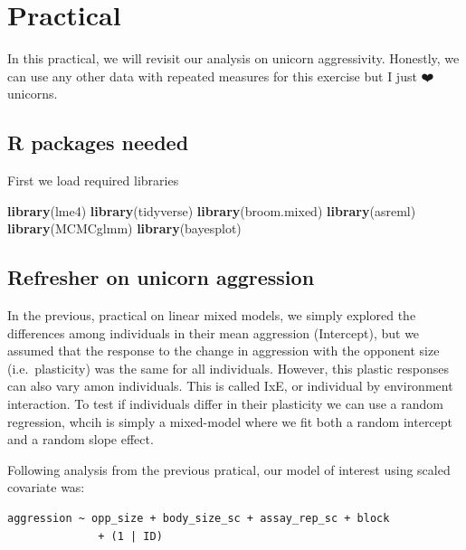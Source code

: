 \documentclass[
  12pt,
]{book}
\newenvironment{Shaded}{\begin{snugshade}}{\end{snugshade}}
\newcommand{\KeywordTok}[1]{\textcolor[rgb]{0.13,0.29,0.53}{\textbf{#1}}}
\newcommand{\NormalTok}[1]{#1}
\begin{document}
\hypertarget{practical-6}{%
\section{Practical}\label{practical-6}}

In this practical, we will revisit our analysis on unicorn aggressivity.
Honestly, we can use any other data with repeated measures for this exercise
but I just ❤️ unicorns.

\hypertarget{r-packages-needed-3}{%
\subsection{R packages needed}\label{r-packages-needed-3}}

First we load required libraries

\begin{Shaded}
\begin{Highlighting}[]
\KeywordTok{library}\NormalTok{(lme4)}
\KeywordTok{library}\NormalTok{(tidyverse)}
\KeywordTok{library}\NormalTok{(broom.mixed)}
\KeywordTok{library}\NormalTok{(asreml)}
\KeywordTok{library}\NormalTok{(MCMCglmm)}
\KeywordTok{library}\NormalTok{(bayesplot)}
\end{Highlighting}
\end{Shaded}

\hypertarget{refresher-on-unicorn-aggression}{%
\subsection{Refresher on unicorn aggression}\label{refresher-on-unicorn-aggression}}

In the previous, practical on linear mixed models, we simply explored the differences among individuals in their mean aggression (Intercept), but we assumed that the response to the change in aggression with the opponent size (i.e.~plasticity) was the same for all individuals. However, this plastic responses can also vary amon individuals. This is called IxE, or individual by environment interaction. To test if individuals differ in their plasticity we can use a random regression, whcih is simply a mixed-model where we fit both a random intercept and a random slope effect.

Following analysis from the previous pratical, our model of interest using scaled covariate was:

\begin{verbatim}
aggression ~ opp_size + body_size_sc + assay_rep_sc + block
              + (1 | ID)
\end{verbatim}
\end{document}
